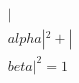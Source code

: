 \documentclass[preview]{standalone}
\begin{document}
\begin{align*}
|\\alpha|^2 + |\\beta|^2 = 1
\end{align*}
\end{document}
